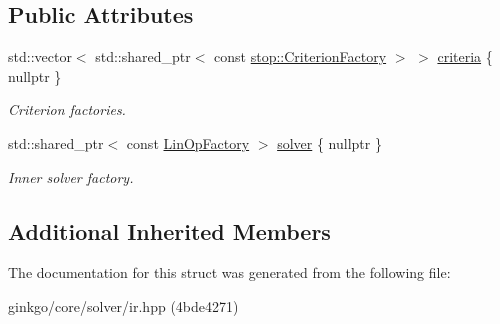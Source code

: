 \subsection*{Public Attributes}
\begin{DoxyCompactItemize}
\item 
\mbox{\label{structgko_1_1solver_1_1Ir_1_1parameters__type_af0f31d5343e290f7974cd780c7be27cc}} 
std\+::vector$<$ std\+::shared\+\_\+ptr$<$ const \hyperlink{namespacegko_1_1stop_ab12a51109c50b35ec36dc5a393d6a9a0}{stop\+::\+Criterion\+Factory} $>$ $>$ \hyperlink{structgko_1_1solver_1_1Ir_1_1parameters__type_af0f31d5343e290f7974cd780c7be27cc}{criteria} \{ nullptr \}
\begin{DoxyCompactList}\small\item\em Criterion factories. \end{DoxyCompactList}\item 
\mbox{\label{structgko_1_1solver_1_1Ir_1_1parameters__type_a787aaabdad4c273ef2ec9ff93672db82}} 
std\+::shared\+\_\+ptr$<$ const \hyperlink{classgko_1_1LinOpFactory}{Lin\+Op\+Factory} $>$ \hyperlink{structgko_1_1solver_1_1Ir_1_1parameters__type_a787aaabdad4c273ef2ec9ff93672db82}{solver} \{ nullptr \}
\begin{DoxyCompactList}\small\item\em Inner solver factory. \end{DoxyCompactList}\end{DoxyCompactItemize}
\subsection*{Additional Inherited Members}


The documentation for this struct was generated from the following file\+:\begin{DoxyCompactItemize}
\item 
ginkgo/core/solver/ir.\+hpp (4bde4271)\end{DoxyCompactItemize}
